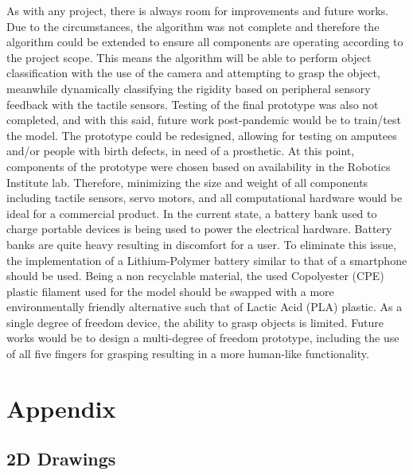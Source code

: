 \documentclass[11.5pt]{article}
\begin{document}
As with any project, there is always room for improvements and future works. Due to the circumstances, the algorithm was not complete and therefore the algorithm could be extended to ensure all components are operating according to the project scope. This means the algorithm will be able to perform object classification with the use of the camera and attempting to grasp the object, meanwhile dynamically classifying the rigidity based on peripheral sensory feedback with the tactile sensors. Testing of the final prototype was also not completed, and with this said, future work post-pandemic would be to train/test the model. The prototype could be redesigned, allowing for testing on amputees and/or people with birth defects, in need of a prosthetic. At this point, components of the prototype were chosen based on availability in the Robotics Institute lab. Therefore, minimizing the size and weight of all components including tactile sensors, servo motors, and all computational hardware would be ideal for a commercial product. In the current state, a battery bank used to charge portable devices is being used to power the electrical hardware. Battery banks are quite heavy resulting in discomfort for a user. To eliminate this issue, the implementation of a Lithium-Polymer battery similar to that of a smartphone should be used. Being a non recyclable material, the used Copolyester (CPE) plastic filament used for the model should be swapped with a more environmentally friendly alternative such that of Lactic Acid (PLA) plastic. As a single degree of freedom device, the ability to grasp objects is limited. Future works would be to design a multi-degree of freedom prototype, including the use of all five fingers for grasping resulting in a more human-like functionality. 


\newpage
  


\newpage
{}%
\renewcommand*{\thepage}{A\arabic{page}}
\appendix 

\section{Appendix}

\subsection{2D Drawings}
\end{document}
